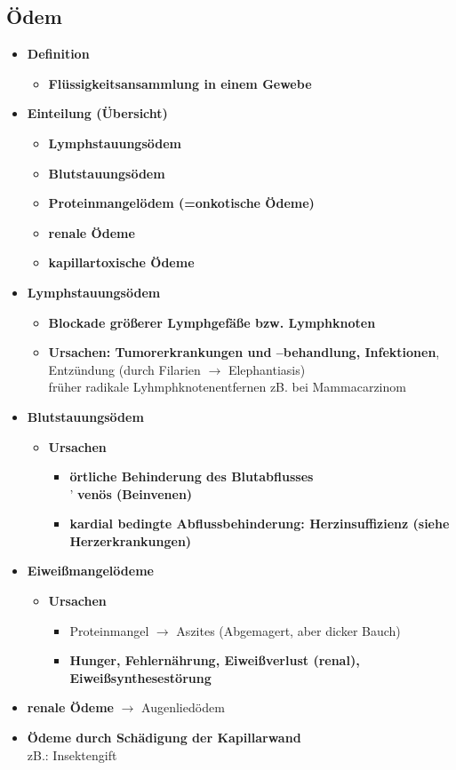 	\subsection*{Ödem}
		\begin{itemize}
			\item \textbf{Definition}
				\begin{itemize}
					\item \textbf{Flüssigkeitsansammlung in einem Gewebe}
				\end{itemize}
			\item \textbf{Einteilung (Übersicht)}
				\begin{itemize}
					\item \textbf{Lymphstauungsödem}
					\item \textbf{Blutstauungsödem}
					\item \textbf{Proteinmangelödem (=onkotische Ödeme)}
					\item \textbf{renale Ödeme}
					\item \textbf{kapillartoxische Ödeme}
				\end{itemize}
			\item \textbf{Lymphstauungsödem}
				\begin{itemize}
					\item \textbf{Blockade größerer Lymphgefäße bzw. Lymphknoten}
					\item \textbf{Ursachen: Tumorerkrankungen und –behandlung, Infektionen}, Entzündung (durch Filarien $\rightarrow$ Elephantiasis)\\
						früher radikale Lyhmphknotenentfernen zB. bei Mammacarzinom
				\end{itemize}
			\item \textbf{Blutstauungsödem}
				\begin{itemize}
					\item \textbf{Ursachen}
						\begin{itemize}
							\item \textbf{örtliche Behinderung des Blutabflusses}\\
								' \textbf{venös (Beinvenen)}
							\item \textbf{kardial bedingte Abflussbehinderung: Herzinsuffizienz (siehe Herzerkrankungen)}
						\end{itemize}
				\end{itemize}
			\item \textbf{Eiweißmangelödeme}
				\begin{itemize}
					\item \textbf{Ursachen}
						\begin{itemize}
							\item Proteinmangel $\rightarrow$ Aszites (Abgemagert, aber dicker Bauch)
							\item \textbf{Hunger, Fehlernährung, Eiweißverlust (renal), Eiweißsynthesestörung}
						\end{itemize}
				\end{itemize}
			\item \textbf{renale Ödeme} $\rightarrow$ Augenliedödem
			\item \textbf{Ödeme durch Schädigung der Kapillarwand}\\
				zB.: Insektengift
		\end{itemize}
